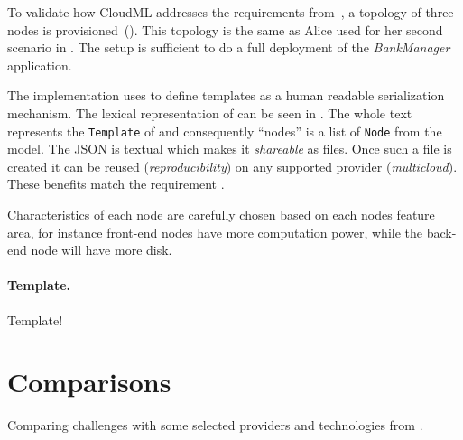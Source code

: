
To validate how CloudML addresses the requirements from~,
a topology of three nodes is provisioned~().
This topology is the same as Alice used for her second scenario in .
The setup is sufficient to do a full deployment of the \emph{BankManager} application.

The implementation uses  to define templates as a human readable serialization mechanism.
The lexical representation of  can be seen in . 
The whole text represents the \texttt{Template} of  and consequently 
``nodes'' is a list of \texttt{Node} from the model.
The JSON is textual which makes it \emph{shareable} as files.
Once such a file is created it can be reused (\emph{reproducibility}) 
on any supported provider (\emph{multicloud}).
These benefits match the requirement .

Characteristics of each node are carefully chosen based on each nodes feature area, for instance 
front-end nodes have more computation power, while the back-end node will have more disk.

\paragraph{Template.}


Template!

\section{Comparisons}


Comparing challenges with some selected providers and technologies from .
